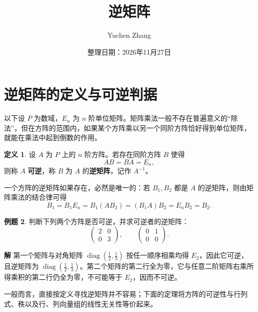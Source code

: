 \documentclass[UTF8, fontset=fandol, a4paper, 12pt]{ctexart}
\title{逆矩阵}
\author{Yuchen Zhang}
\date{整理日期：2026年11月27日}
\makeatletter
\theoremstyle{definition}
\newtheorem{definition}{定义}[section]
\newtheorem{example}[definition]{例题}
\renewcommand{\maketitle}{%
  \begin{center}
    {\LARGE\bfseries \@title\par}\vspace{0.6em}
    \@author\par\vspace{0.2em}
    {\small \@date\par}
  \end{center}
}
\makeatother
\begin{document}
\maketitle

\section{逆矩阵的定义与可逆判据}

以下设 $P$ 为数域，$E_n$ 为 $n$ 阶单位矩阵。矩阵乘法一般不存在普遍意义的“除法”，但在方阵的范围内，如果某个方阵乘以另一个同阶方阵恰好得到单位矩阵，就能在乘法中起到倒数的作用。

\begin{definition}
设 $A$ 为 $P$ 上的 $n$ 阶方阵。若存在同阶方阵 $B$ 使得
\[
 AB=BA=E_n,
\]
则称 $A$ \textbf{可逆}，称 $B$ 为 $A$ 的\textbf{逆矩阵}，记作 $A^{-1}$。
\end{definition}

一个方阵的逆矩阵如果存在，必然是唯一的：若 $B_1,B_2$ 都是 $A$ 的逆矩阵，则由矩阵乘法的结合律可得
\[
 B_1=B_1E_n=B_1(AB_2)=(B_1A)B_2=E_nB_2=B_2.
\]

\begin{example}
判断下列两个方阵是否可逆，并求可逆者的逆矩阵：
\[
 \begin{pmatrix}2&0\\0&3\end{pmatrix},\qquad
 \begin{pmatrix}0&1\\0&0\end{pmatrix}.
\]
\end{example}
\noindent\textbf{解}\quad
第一个矩阵与对角矩阵 $\operatorname{diag}(\tfrac12,\tfrac13)$ 按任一顺序相乘均得 $E_2$，因此它可逆，且逆矩阵为 $\operatorname{diag}(\tfrac12,\tfrac13)$。第二个矩阵的第二行全为零，它与任意二阶矩阵右乘所得乘积的第二行仍全为零，不可能等于 $E_2$，因而不可逆。

一般而言，直接按定义寻找逆矩阵并不容易；下面的定理将方阵的可逆性与行列式、秩以及行、列向量组的线性无关性等价起来。
\end{document}
